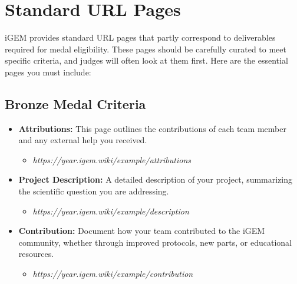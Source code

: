 

\section{Standard URL Pages}\label{sec:standard-url-pages} 

iGEM provides standard URL pages that partly correspond to deliverables required for medal eligibility.
These pages should be carefully curated to meet specific criteria, and judges will often look at them first.
Here are the essential pages you must include:

\subsection*{Bronze Medal Criteria} 
\begin{itemize}
    \item \textbf{Attributions:} This page outlines the contributions of each team member and any external help you received.
    \begin{itemize}
        \item \textit{https://year.igem.wiki/example/attributions}
    \end{itemize}
    \item \textbf{Project Description:} A detailed description of your project, summarizing the scientific question you are addressing.
    \begin{itemize}
        \item  \textit{https://year.igem.wiki/example/description}
    \end{itemize}
    \item \textbf{Contribution:} Document how your team contributed to the iGEM community, whether through improved protocols, new parts, or educational resources.
    \begin{itemize}
        \item  \textit{https://year.igem.wiki/example/contribution}
    \end{itemize}
\end{itemize}

